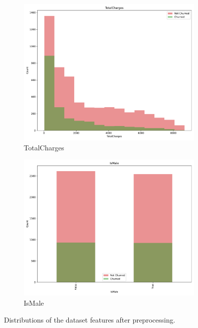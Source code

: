 \documentclass[a4paper,11pt]{article}
\begin{document}
\begin{landscape}
\begin{figure}
\begin{subfigure}{0.14\linewidth}
    \includegraphics[width=\linewidth]{figures/understanding/TotalCharges.pdf}
    \caption{TotalCharges}
\end{subfigure}
\begin{subfigure}{0.14\linewidth}
    \includegraphics[width=\linewidth]{figures/understanding/IsMale.pdf}
    \caption{IsMale}
\end{subfigure}

\caption{Distributions of the dataset features after preprocessing.}
\label{fig:all_feature_histograms}
\end{figure}
\end{landscape}
\end{document}
